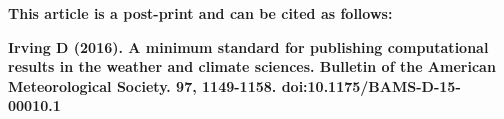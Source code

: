 \textbf{This article is a post-print and can be cited as follows:} 

\textbf{Irving D (2016). A minimum standard for publishing computational results in the weather and climate sciences. Bulletin of the American Meteorological Society. 97, 1149-1158. doi:10.1175/BAMS-D-15-00010.1}